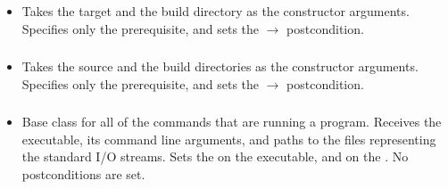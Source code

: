 \subsubsection*{}\label{subsec:Make}

\begin{itemize}[label={}]
    \item Takes the target and the build directory as the constructor arguments.
          Specifies only the \hyperref[subsec:ProgramExistsPrerequisite]{}
          prerequisite, and sets the
          \hyperref[subsec:ExitCodePostcondition]{} $\rightarrow$ 
          postcondition.
\end{itemize}

\subsubsection*{}\label{subsec:CMake}

\begin{itemize}[label={}]
    \item Takes the source and the build directories as the constructor arguments.
          Specifies only the \hyperref[subsec:ProgramExistsPrerequisite]{}
          prerequisite, and sets the
          \hyperref[subsec:ExitCodePostcondition]{} $\rightarrow$ 
          postcondition.
\end{itemize}

\subsubsection*{}\label{subsec:Run}

\begin{itemize}[label={}]
    \item Base class for all of the commands that are running a program.
          Receives the executable, its command line arguments, and paths to the files representing the standard I/O
          streams.
          Sets the \hyperref[subsec:ProgramExistsPrerequisite]{} on the
          executable, and \hyperref[subsec:FileExistsPrerequisite]{} on the
          .
          No postconditions are set.
\end{itemize}

\subsubsection*{}\label{subsec:RunSolution}

